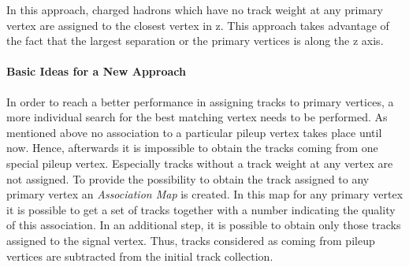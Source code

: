 In this approach, charged hadrons which have no track weight at any primary vertex are assigned to the closest vertex in z. This approach takes advantage of the fact that the largest separation or the primary vertices is along the z axis.

\paragraph{Basic Ideas for a New Approach}

In order to reach a better performance in assigning tracks to primary vertices, a more individual search for the best matching vertex needs to be performed. As mentioned above no association to a particular pileup vertex takes place until now. Hence, afterwards it is impossible to obtain the tracks coming from one special pileup vertex. Especially tracks without a track weight at any vertex are not assigned. To provide the possibility to obtain the track assigned to any primary vertex an \textit{Association Map} is created. In this map for any primary vertex it is possible to get a set of tracks together with a number indicating the quality of this association. In an additional step, it is possible to obtain only those tracks assigned to the signal vertex. Thus, tracks considered as coming from pileup vertices are subtracted from the initial track collection.

